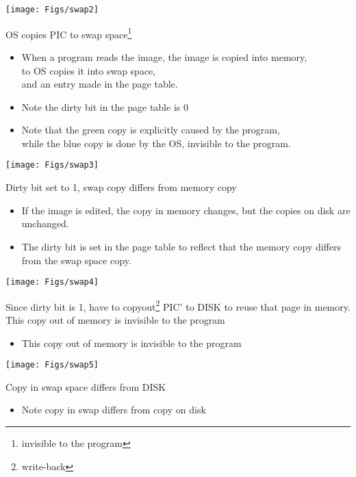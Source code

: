 \begin{frame}[fragile]
\centerline{\texttt{[image: Figs/swap2]}}
OS copies PIC to swap space\footnote{invisible to the program}
\BNotes\ifnum{}
\begin{itemize}
\item When a program reads the image, the image is copied into memory,\\
  to OS copies it into swap space,\\
  and an entry made in the page table.
\item Note the dirty bit in the page table is 0
\item Note that the green copy is explicitly caused by the program, \\
			while the blue copy is done by the OS, invisible to
			the program.
\end{itemize}
\fi\ENotes
\end{frame}

\begin{frame}[fragile]
\centerline{\texttt{[image: Figs/swap3]}}
Dirty bit set to 1, swap copy differs from memory copy
\BNotes\ifnum{}
\begin{itemize}
\item If the image is edited, the copy in memory changes, but the copies on disk are unchanged.
\item The dirty bit is set in the page table to reflect that the memory copy differs from the swap space copy.
\end{itemize}
\fi\ENotes
\end{frame}

\begin{frame}[fragile]
\centerline{\texttt{[image: Figs/swap4]}}
Since dirty bit is 1, have to copyout\footnote{write-back} PIC' to DISK to reuse that page in memory. This copy out of memory is invisible to the program
\BNotes\ifnum{}
\begin{itemize}
\item This copy out of memory is invisible to the program
\end{itemize}
\fi\ENotes
\end{frame}


\begin{frame}[fragile]
\centerline{\texttt{[image: Figs/swap5]}}
Copy in swap space differs from DISK
\BNotes\ifnum{}
\begin{itemize}
\item Note copy in swap differs from copy on disk
\end{itemize}
\fi\ENotes
\end{frame}

